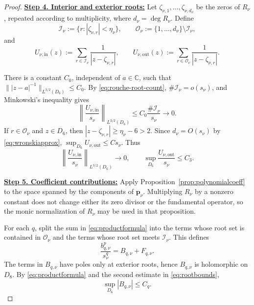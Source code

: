 \documentclass[12pt,letterpaper,reqno]{amsart}
\theoremstyle{definition}
\numberwithin{equation}{section}
\newcommand{\C}{\mathbb C}
\newcommand{\pv}{\bm p}
\begin{document}
\begin{proof}
\medskip\noindent
\textbf{\underline{Step 4. Interior and exterior roots:}}
Let
\(\zeta_{\nu,1},\ldots,\zeta_{\nu,d_\nu}\) be the zeros of \(R_\nu\),
repeated according to multiplicity, where
\(d_\nu=\deg R_\nu\). Define
\[
 \mathcal I_\nu
 :=
 \{r:|\zeta_{\nu,r}|<\eta_\nu\},
 \qquad
 \mathcal O_\nu
 :=
 \{1,\ldots,d_\nu\}\setminus\mathcal I_\nu,
\]
and
\[
 U_{\nu,\mathrm{in}}(z)
 :=
 \sum_{r\in\mathcal I_\nu}
 \frac1{|z-\zeta_{\nu,r}|},
 \qquad
 U_{\nu,\mathrm{out}}(z)
 :=
 \sum_{r\in\mathcal O_\nu}
 \frac1{|z-\zeta_{\nu,r}|}.
\]

There is a constant \(C_0\), independent of \(a\in\C\), such that
\(\||z-a|^{-1}\|_{L^{3/2}(D_6)}\leq C_0\).
By \eqref{eq:rouche-root-count},
\(\#\mathcal I_\nu=o(s_\nu)\), and Minkowski's inequality gives
\[
 \left\|
 \frac{U_{\nu,\mathrm{in}}}{s_\nu}
 \right\|_{L^{3/2}(D_6)}
 \leq
 C_0\frac{\#\mathcal I_\nu}{s_\nu}
 \longrightarrow0.
\]
If \(r\in\mathcal O_\nu\) and \(z\in D_6\), then
\(|z-\zeta_{\nu,r}|\geq\eta_\nu-6>2\).
Since \(d_\nu=O(s_\nu)\) by \eqref{eq:wronskiapprox},
\(\sup_{D_6}U_{\nu,\mathrm{out}}\leq C s_\nu\).
Thus
\begin{equation}\label{eq:rootbounds}
 \left\|
 \frac{U_{\nu,\mathrm{in}}}{s_\nu}
 \right\|_{L^{3/2}(D_6)}
 \longrightarrow0,
 \qquad
 \sup_{D_6}
 \frac{U_{\nu,\mathrm{out}}}{s_\nu}
 \leq C_3.
\end{equation}


\medskip\noindent
\textbf{\underline{Step 5. Coefficient contributions:}}
Apply Proposition~\ref{prop:polynomialcoeff} to the space spanned by
the components of \(\pv_\nu\). Multiplying
\(R_\nu\) by a nonzero constant does not change either its zero divisor
or the fundamental operator, so the monic normalization of \(R_\nu\)
may be used in that proposition.

For each \(q\), split the sum in \eqref{eq:productformula} into the
terms whose root set is contained in \(\mathcal O_\nu\) and the terms
whose root set meets \(\mathcal I_\nu\). This defines
\begin{equation}\label{eq:splitcoeff}
 \frac{b_{q,\nu}^p}{s_\nu^q}
 =
 B_{q,\nu}+F_{q,\nu}.
\end{equation}
The terms in \(B_{q,\nu}\) have poles only at exterior roots, hence
\(B_{q,\nu}\) is holomorphic on \(D_8\). By
\eqref{eq:productformula} and the second estimate in
\eqref{eq:rootbounds},
\begin{equation}\label{eq:B-bound}
 \sup_{D_6}|B_{q,\nu}|
 \leq C_q.
\end{equation}


\end{proof}
\end{document}
